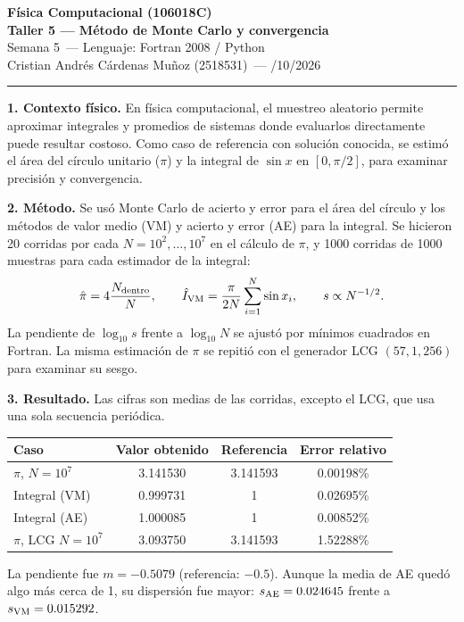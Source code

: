 \documentclass[11pt]{article}
\newcommand{\curso}{Física Computacional (106018C)}
\newcommand{\taller}{Taller 5 --- Método de Monte Carlo y convergencia}
\newcommand{\semana}{Semana 5}
\newcommand{\lenguaje}{Fortran 2008 / Python}
\newcommand{\estudiante}{Cristian Andrés Cárdenas Muñoz (2518531)}
\newcommand{\fechaentrega}{26/10/2026} %
\begin{document}
\begin{center}
{\large\bfseries \curso} \\[2pt]
{\bfseries \taller} \\[2pt]
\semana\ \quad --- \quad Lenguaje: \lenguaje \\[2pt]
\estudiante\ \quad --- \quad \fechaentrega
\end{center}
\vspace{4pt}\hrule\vspace{6pt}

\textbf{1. Contexto físico.}
En física computacional, el muestreo aleatorio permite aproximar integrales y promedios de sistemas donde evaluarlos directamente puede resultar costoso. Como caso de referencia con solución conocida, se estimó el área del círculo unitario (\(\pi\)) y la integral de \(\sin x\) en \([0,\pi/2]\), para examinar precisión y convergencia.

\textbf{2. Método.}
Se usó Monte Carlo de acierto y error para el área del círculo y los métodos de valor medio (VM) y acierto y error (AE) para la integral. Se hicieron 20 corridas por cada \(N=10^2,\ldots,10^7\) en el cálculo de \(\pi\), y 1000 corridas de 1000 muestras para cada estimador de la integral:
\begin{equation*}
\hat\pi=4\frac{N_{\rm dentro}}{N},\qquad
\hat I_{\rm VM}=\frac{\pi}{2N}\sum_{i=1}^N\sin x_i,\qquad
s\propto N^{-1/2}.
\end{equation*}
La pendiente de \(\log_{10}s\) frente a \(\log_{10}N\) se ajustó por mínimos cuadrados en Fortran. La misma estimación de \(\pi\) se repitió con el generador LCG \((57,1,256)\) para examinar su sesgo.

\textbf{3. Resultado.}
Las cifras son medias de las corridas, excepto el LCG, que usa una sola secuencia periódica.
\begin{center}
\begin{tabular}{lccc}
\toprule
Caso & Valor obtenido & Referencia & Error relativo \\
\midrule
\(\pi\), \(N=10^7\) & 3.141530 & 3.141593 & 0.00198\% \\
Integral (VM) & 0.999731 & 1 & 0.02695\% \\
Integral (AE) & 1.000085 & 1 & 0.00852\% \\
\(\pi\), LCG \(N=10^7\) & 3.093750 & 3.141593 & 1.52288\% \\
\bottomrule
\end{tabular}
\end{center}
La pendiente fue \(m=-0.5079\) (referencia: \(-0.5\)). Aunque la media de AE quedó algo más cerca de 1, su dispersión fue mayor: \(s_{\rm AE}=0.024645\) frente a \(s_{\rm VM}=0.015292\).
\end{document}
